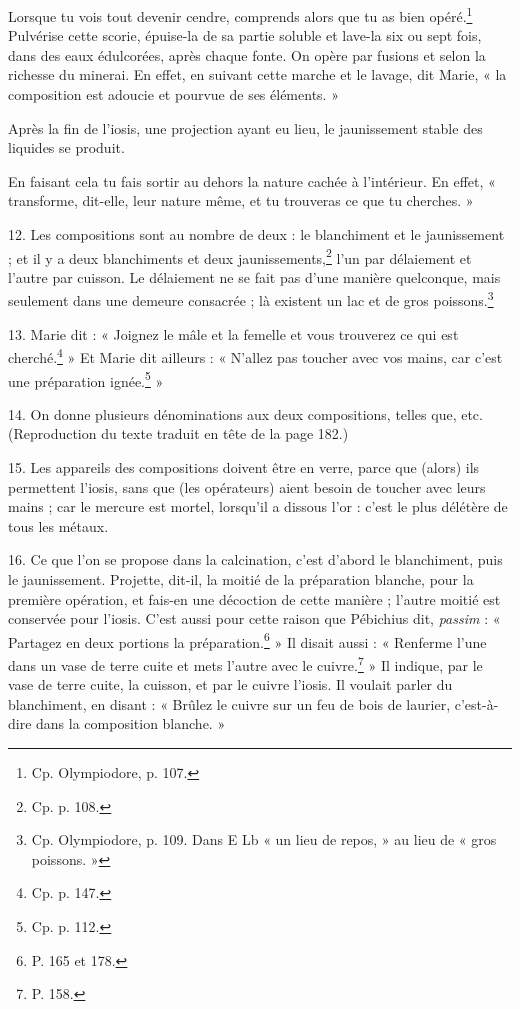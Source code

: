 \documentclass[landscape, a4paper, 11pt, oneside, polutonikogreek, french]{article}
\begin{document}
Lorsque tu vois tout devenir cendre, comprends alors que tu as bien opéré.\footnote{Cp. Olympiodore, p. 107.} Pulvérise cette scorie, épuise-la de sa partie soluble et lave-la six ou sept fois, dans des eaux édulcorées, après chaque fonte. On opère par fusions et selon la richesse du minerai. En effet, en suivant cette marche et le lavage, dit Marie, « la composition est adoucie et pourvue de ses éléments. »

Après la fin de l'iosis, une projection ayant eu lieu, le jaunissement stable des liquides se produit.

En faisant cela tu fais sortir au dehors la nature cachée à l'intérieur. En effet, « transforme, dit-elle, leur nature même, et tu trouveras ce que tu cherches. »

12. Les compositions sont au nombre de deux : le blanchiment et le jaunissement ; et il y a deux blanchiments et deux jaunissements,\footnote{Cp. p. 108.} l'un par délaiement et l'autre par cuisson. Le délaiement ne se fait pas d'une manière quelconque, mais seulement dans une demeure consacrée ; là existent un lac et de gros poissons.\footnote{Cp. Olympiodore, p. 109. Dans E Lb « un lieu de repos, » au lieu de « gros poissons. »}

13. Marie dit : « Joignez le mâle et la femelle et vous trouverez ce qui est cherché.\footnote{Cp. p. 147.} » Et Marie dit ailleurs : « N'allez pas toucher avec vos mains, car c'est une préparation ignée.\footnote{Cp. p. 112.} »

14. On donne plusieurs dénominations aux deux compositions, telles que, etc. (Reproduction du texte traduit en tête de la page 182.)

15. Les appareils des compositions doivent être en verre, parce que (alors) ils permettent l'iosis, sans que (les opérateurs) aient besoin de toucher avec leurs mains ; car le mercure est mortel, lorsqu'il a dissous l'or : c'est le plus délétère de tous les métaux.

16. Ce que l'on se propose dans la calcination, c'est d'abord le blanchiment, puis le jaunissement. Projette, dit-il, la moitié de la préparation blanche, pour la première opération, et fais-en une décoction de cette manière ; l'autre moitié est conservée pour l'iosis. C'est aussi pour cette raison que Pébichius dit, \emph{passim} : « Partagez en deux portions la préparation.\footnote{P. 165 et 178.} » Il disait aussi : « Renferme l'une dans un vase de terre cuite et mets l'autre avec le cuivre.\footnote{P. 158.} » Il indique, par le vase de terre cuite, la cuisson, et par le cuivre l'iosis. Il voulait parler du blanchiment, en disant : « Brûlez le cuivre sur un feu de bois de laurier, c'est-à-dire dans la composition blanche. »
\end{document}
